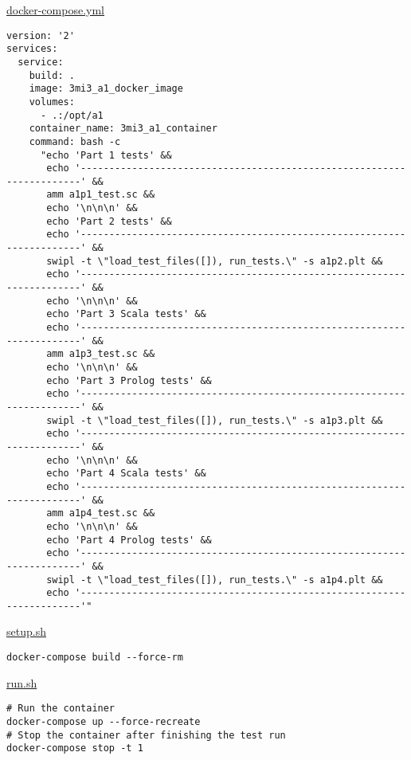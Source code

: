 \documentclass[11pt]{article}
\begin{document}
\href{./testing/a1/docker-compose.yml}{docker-compose.yml}
\begin{verbatim}
version: '2'
services:
  service:
    build: .
    image: 3mi3_a1_docker_image
    volumes:
      - .:/opt/a1
    container_name: 3mi3_a1_container
    command: bash -c
      "echo 'Part 1 tests' &&
       echo '----------------------------------------------------------------------' &&
       amm a1p1_test.sc &&
       echo '\n\n\n' &&
       echo 'Part 2 tests' &&
       echo '----------------------------------------------------------------------' &&
       swipl -t \"load_test_files([]), run_tests.\" -s a1p2.plt &&
       echo '----------------------------------------------------------------------' &&
       echo '\n\n\n' &&
       echo 'Part 3 Scala tests' &&
       echo '----------------------------------------------------------------------' &&
       amm a1p3_test.sc &&
       echo '\n\n\n' &&
       echo 'Part 3 Prolog tests' &&
       echo '----------------------------------------------------------------------' &&
       swipl -t \"load_test_files([]), run_tests.\" -s a1p3.plt &&
       echo '----------------------------------------------------------------------' &&
       echo '\n\n\n' &&
       echo 'Part 4 Scala tests' &&
       echo '----------------------------------------------------------------------' &&
       amm a1p4_test.sc &&
       echo '\n\n\n' &&
       echo 'Part 4 Prolog tests' &&
       echo '----------------------------------------------------------------------' &&
       swipl -t \"load_test_files([]), run_tests.\" -s a1p4.plt &&
       echo '----------------------------------------------------------------------'"
\end{verbatim}

\href{./testing/a1/setup.sh}{setup.sh}
\begin{verbatim}
docker-compose build --force-rm
\end{verbatim}

\href{./testing/a1/run.sh}{run.sh}
\begin{verbatim}
# Run the container
docker-compose up --force-recreate
# Stop the container after finishing the test run
docker-compose stop -t 1
\end{verbatim}
\end{document}
